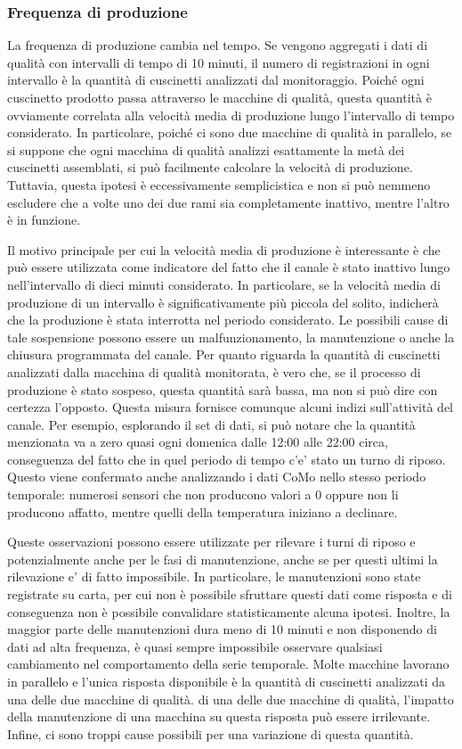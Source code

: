 \subsubsection{Frequenza di produzione}
La frequenza di produzione cambia nel tempo. Se vengono aggregati i dati di qualità con intervalli di tempo di 10 minuti, il numero di registrazioni in ogni intervallo è la quantità di cuscinetti analizzati dal monitoraggio.
Poiché ogni cuscinetto prodotto passa attraverso le macchine di qualità, questa quantità è ovviamente correlata alla velocità media di produzione
lungo l'intervallo di tempo considerato. In particolare, poiché ci sono due macchine di qualità in parallelo, se si suppone che ogni macchina di qualità analizzi esattamente la metà dei cuscinetti assemblati, si può facilmente calcolare la velocità di produzione. Tuttavia, questa ipotesi è eccessivamente semplicistica e non si può nemmeno escludere che a volte uno dei due rami sia completamente inattivo, mentre l'altro è in funzione. 

Il motivo principale per cui la velocità media di produzione è interessante è che può essere utilizzata come indicatore del fatto che il canale è stato inattivo lungo nell'intervallo di dieci minuti considerato. In particolare, se la velocità media di produzione di un intervallo è significativamente più piccola del solito, indicherà che la produzione è stata interrotta nel periodo considerato. Le possibili cause di tale sospensione possono essere un malfunzionamento, la manutenzione o anche la chiusura programmata del canale.
Per quanto riguarda la quantità di cuscinetti analizzati dalla macchina di qualità monitorata, è vero che, se il processo di produzione è stato sospeso, questa quantità sarà bassa, ma non si può dire con certezza l'opposto.
Questa misura fornisce comunque alcuni indizi sull'attività del canale. Per esempio, esplorando il set di dati, si può notare che la quantità menzionata va a zero quasi ogni domenica dalle 12:00 alle 22:00 circa, conseguenza del fatto che in quel periodo di tempo c'e' stato un turno di riposo. Questo viene confermato anche analizzando i dati CoMo nello stesso periodo temporale: numerosi sensori che non producono valori a 0 oppure non li producono affatto, mentre quelli della temperatura iniziano a declinare. 

Queste osservazioni possono essere utilizzate per rilevare i turni di riposo e potenzialmente anche per le fasi di manutenzione, anche se per questi ultimi la rilevazione e' di fatto impossibile. In particolare, le manutenzioni sono state registrate su carta, per cui non è possibile sfruttare questi dati come risposta e di conseguenza non è possibile convalidare statisticamente alcuna ipotesi.
Inoltre, la maggior parte delle manutenzioni dura meno di 10 minuti e
non disponendo di dati ad alta frequenza, è quasi sempre impossibile
osservare qualsiasi cambiamento nel comportamento della serie temporale. Molte macchine lavorano in parallelo e l'unica risposta disponibile è la quantità di cuscinetti analizzati da una delle due macchine di qualità.
di una delle due macchine di qualità, l'impatto della manutenzione di una macchina su questa risposta può essere irrilevante.
Infine, ci sono troppi cause possibili per una variazione di questa quantità.

